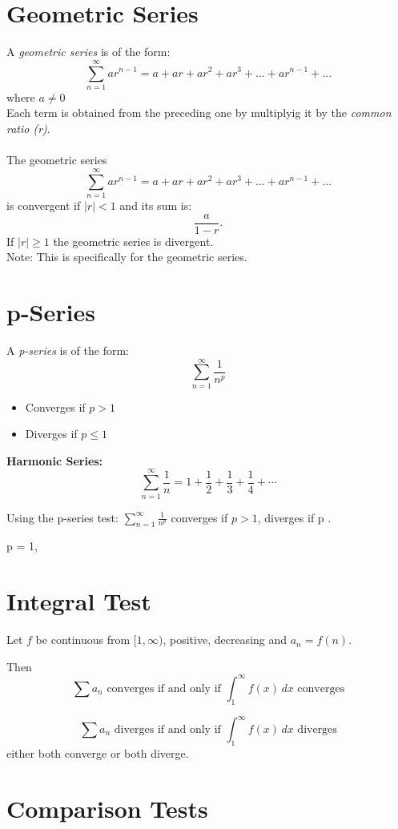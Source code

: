 \documentclass[11pt]{article}
\theoremstyle{mydef}
\begin{document}
\section*{Geometric Series}
A \textit{geometric series} is of the form:
\[
\sum_{n=1}^{\infty} ar^{n-1}=a+ar+ar^2+ar^3+...+ar^{n-1}+...
\]
where $a\neq 0$\\
Each term is obtained from the preceding one by multiplyig it by the \textit{common ratio (r)}.\\
\\
The geometric series 
\[
\sum_{n=1}^{\infty} ar^{n-1}=a+ar+ar^2+ar^3+...+ar^{n-1}+...
\]
is convergent if $|r|<1$ and its sum is:
\[
\frac{a}{1-r}.
\]
If $|r|\ge1$ the geometric series is divergent.\\
Note: This is specifically for the geometric series.

\section*{p-Series}
A \textit{p-series} is of the form:
\[
\sum_{n=1}^{\infty} \frac{1}{n^p}
\]

\begin{itemize}
\item Converges if $p>1$
\item Diverges if $p\le1$
\end{itemize}

\textbf{Harmonic Series:}
\[
\sum_{n=1}^{\infty} \frac{1}{n} = 1 + \frac{1}{2} + \frac{1}{3} + \frac{1}{4} + \cdots
\]

Using the p-series test: $\sum_{n=1}^{\infty} \frac{1}{n^p}$ converges if $p>1$, diverges if p .

 p = 1, 

\section*{Integral Test}

Let $f$ be continuous from $[1,\infty)$, positive, decreasing and $a_n=f(n)$.

Then
\[
\sum a_n \text{  converges if and only if } \int_1^\infty f(x)\,dx \text{ converges}
\]

\[
\sum a_n \text{  diverges if and only if } \int_1^\infty f(x)\,dx \text{ diverges}
\]
either both converge or both diverge.

\section*{Comparison Tests}
\end{document}
